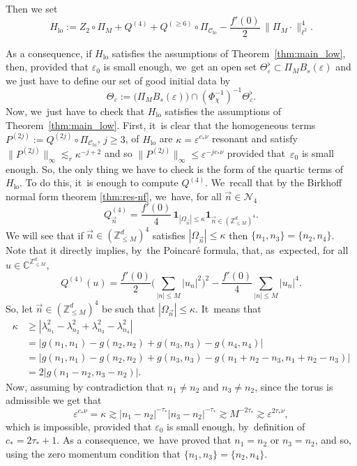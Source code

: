 \documentclass[10pt,a4paper]{amsart}
\theoremstyle{plain}
\theoremstyle{definition}
\DeclareMathOperator{\lo}{lo}
\newcommand{\1}{\mathbf{1}}
\newcommand{\Clo}{\mathscr{C}_{\lo}}
\begin{document}
Then we set
\begin{equation}
\label{eq:defHlo}
H_{\lo} := Z_2\circ \Pi_M + Q^{(4)} + Q^{(\geq 6)} \circ \Pi_{\Clo} -\frac{f'(0)}2\, \| \Pi_{M} \cdot\|_{\ell^2}^4.
\end{equation}

As a consequence, if $H_{\lo} $ satisfies the assumptions of Theorem~\ref{thm:main_low}, then, provided that $\varepsilon_{0}$ is small enough, we~get an open set
$
\Theta_{\varepsilon}^\flat \subset \Pi_{M} B_s(\varepsilon)
$
and we just have to define our set of good initial data by
\begin{equation}
\label{eq:def_lens_des_condinit}
\Theta_{\varepsilon} := \big(\Pi_{ M } B_s(\varepsilon) \big)\cap (\Phi_{\chi}^{-1})^{-1} \Theta_{\varepsilon}^\flat.
\end{equation}
Now, we~just have to check that $H_{\lo} $ satisfies the assumptions of Theorem~\ref{thm:main_low}. First, it~is clear that the homogeneous terms $P^{(2j)} := Q^{(2j)} \circ \Pi_{\Clo}$, $j\geq 3$, of $H_{\lo} $ are $\kappa = \varepsilon^{c_\ast \nu}$ resonant and satisfy $\| P^{(2j)} \|_{\infty} \lesssim_r \kappa^{-j+2}$ and so $\| P^{(2j)} \|_{\infty} \leq \varepsilon^{-jc_\ast \nu}$ provided that~$\varepsilon_0$ is small enough. So, the only thing we have to check is the form of the quartic terms of~$H_{\lo}$. To do this, it~is enough to compute $Q^{(4)}$. We~recall that by the Birkhoff normal form theorem \ref{thm:res-nf}, we~have, for all $\vec{n} \in \mathcal{N}_4$
\[
Q^{(4)}_{\vec{n}} = \frac{f'(0)}4\, \mathbf{1}_{|\Omega_{\vec{n}}|\leq \kappa} \mathbf{1}_{\vec{n} \in (\mathbb{Z}^d_{\leq M})^4}.
\]
We will see that if $\vec{n} \in (\mathbb{Z}^d_{\leq M})^4$ satisfies $|\Omega_{\vec{n}}|\leq \kappa$ then $\{ n_1,n_3\} = \{n_2,n_4\}$. Note that it directly implies, by~the Poincaré formula, that, as~expected, for all $u\in \mathbb{C}^{\mathbb{Z}^d_{\leq M}}$,
\[
Q^{(4)}(u) = \frac{f'(0)}2 \Big(\sum_{|n|\leq M} |u_n|^2 \Big)^2 - \frac{f'(0)}4 \sum_{|n|\leq M} |u_n|^4.
\]
So, let $\vec{n} \in (\mathbb{Z}^d_{\leq M})^4$ be such that $|\Omega_{\vec{n}}|\leq \kappa$. It~means that
\begin{equation*}
\begin{split}
\kappa &\geq |\lambda_{n_1}^2 - \lambda_{n_2}^2 + \lambda_{n_3}^2 - \lambda_{n_4}^2| \\
&= |g(n_1,n_1) - g(n_2,n_2) + g(n_3,n_3) - g(n_4,n_4) | \\
&= |g(n_1,n_1) - g(n_2,n_2) + g(n_3,n_3) - g(n_1+n_2-n_3,n_1+n_2-n_3) | \\
&= 2|g(n_1-n_2,n_3-n_2)|.
\end{split}
\end{equation*}
Now, assuming by contradiction that $n_1\neq n_2$ and $n_3\neq n_2$, since the torus is admissible we get that
\[
\varepsilon^{ c_\ast \nu} = \kappa \gtrsim |n_1-n_2|^{-\tau_\ast} |n_3-n_2|^{-\tau_\ast} \gtrsim M^{-2\tau_\ast} \gtrsim \varepsilon^{2\tau_\ast \nu},
\]
which is impossible, provided that $\varepsilon_0$ is small enough, by~definition of $c_\ast = 2\tau_\ast+1$.
As a consequence, we~have proved that $n_1 = n_2$ or $n_3= n_2$, and so, using the zero momentum condition that $\{ n_1,n_3\} = \{n_2,n_4\}$.
\end{document}
